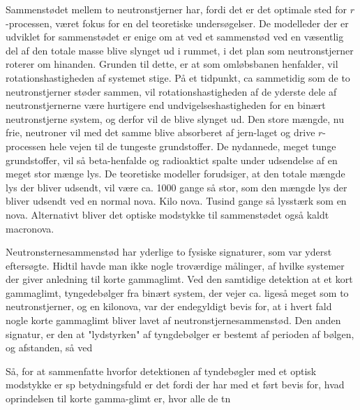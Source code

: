 \documentclass[twocolumn]{article}
\begin{document}
Sammenstødet mellem to neutronstjerner har, fordi det er det optimale sted for $r$-processen, været fokus for en del teoretiske undersøgelser. De modelleder der er udviklet for sammenstødet er enige om at ved et sammenstød ved en væsentlig del af den totale masse blive slynget ud i rummet, i det plan som neutronstjerner roterer om hinanden. Grunden til dette, er at som omløbsbanen henfalder, vil rotationshastigheden af systemet stige. På et tidpunkt, ca sammetidig som de to neutronstjerner støder sammen, vil rotationshastigheden af de yderste dele af neutronstjernerne være hurtigere end undvigelseshastigheden for en binært neutronstjerne system, og derfor vil de blive slynget ud. Den store mængde, nu frie, neutroner vil med det samme blive absorberet af jern-laget og drive $r$-processen hele vejen til de tungeste grundstoffer. De nydannede, meget tunge grundstoffer, vil så beta-henfalde og radioaktict spalte under udsendelse af en meget stor mænge lys. De teoretiske modeller forudsiger, at den totale mængde lys der bliver udsendt, vil være ca. 1000 gange så stor, som den mængde lys der bliver udsendt ved en normal nova. Kilo nova. Tusind gange så lysstærk som en nova. Alternativt bliver det optiske modstykke til sammenstødet også kaldt macronova. 

Neutronsternesammenstød har yderlige to fysiske signaturer, som var yderst eftersøgte. Hidtil havde man ikke nogle troværdige målinger, af hvilke systemer der giver anledning til korte gammaglimt. Ved den samtidige detektion at et kort gammaglimt, tyngedebølger fra binært system, der vejer ca. ligeså meget som to neutronstjerner, og en kilonova, var der endegyldigt bevis for, at i hvert fald nogle korte gammaglimt bliver lavet af neutronstjernesammenstød. Den anden signatur, er den at "lydstyrken" af tyngdebølger er bestemt af perioden af bølgen, og afstanden, så ved 

Så, for at sammenfatte hvorfor detektionen af tyndebøgler med et optisk modstykke er sp betydningsfuld er det fordi der har med et ført bevis for, hvad oprindelsen til korte gamma-glimt er, hvor alle de tn
\end{document}
